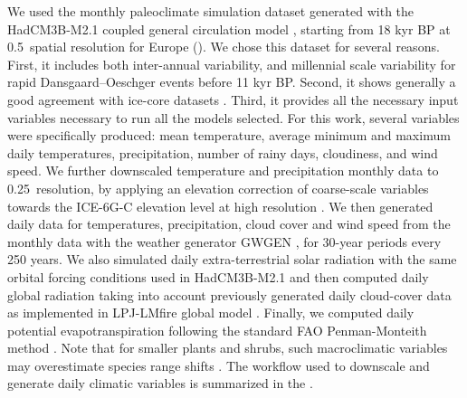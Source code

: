 We used the monthly paleoclimate simulation dataset generated with the HadCM3B-M2.1 coupled general circulation model \citep{Armstrong2019}, starting from 18 kyr BP at 0.5\degree~spatial resolution for Europe (). We chose this dataset for several reasons. First, it includes both inter-annual variability, and millennial scale variability for rapid Dansgaard–Oeschger events before 11 kyr BP. Second, it shows generally a good agreement with ice-core datasets \citep{Armstrong2019}. Third, it provides all the necessary input variables necessary to run all the models selected.  For this work, several variables were specifically produced: mean temperature, average minimum and maximum daily temperatures, precipitation, number of rainy days, cloudiness, and wind speed. We further downscaled temperature and precipitation monthly data to 0.25\degree~resolution, by applying an elevation correction of coarse-scale variables towards the ICE-6G-C elevation level at high resolution \citep{Peltier2015}.  
We then generated daily data for temperatures, precipitation, cloud cover and wind speed from  the monthly data with the weather generator GWGEN \citep{Sommer2017}, for 30-year periods every 250 years. We also simulated daily extra-terrestrial solar radiation with the same orbital forcing conditions used in HadCM3B-M2.1 \citep{Armstrong2019} and then computed daily global radiation taking into account previously generated daily cloud-cover data as implemented in LPJ-LMfire global model \citep{Pfeiffer2013}. Finally, we computed daily potential evapotranspiration following the standard FAO Penman-Monteith method \citep{Allen1998}. Note that for smaller plants and shrubs, such macroclimatic variables may overestimate species range shifts \citep{Maclean2023}. The workflow used to downscale and generate daily climatic variables is summarized in the .

